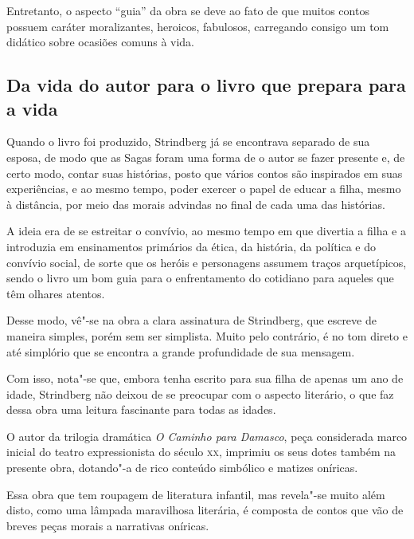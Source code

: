 \documentclass[12pt]{extarticle}
\begin{document}
Entretanto, o aspecto ``guia'' da obra se deve ao fato de que muitos
contos possuem caráter moralizantes, heroicos, fabulosos, carregando
consigo um tom didático sobre ocasiões comuns à vida.

\subsection{Da vida do autor para o livro que prepara para a vida}

Quando o livro foi produzido, Strindberg já se encontrava separado de
sua esposa, de modo que as Sagas foram uma forma de o autor se fazer
presente e, de certo modo, contar suas histórias, posto que vários
contos são inspirados em suas experiências, e ao mesmo tempo, poder
exercer o papel de educar a filha, mesmo à distância, por meio das
morais advindas no final de cada uma das histórias.




A ideia era de se estreitar o convívio, ao mesmo tempo em que divertia a
filha e a introduzia em ensinamentos primários da ética, da história, da
política e do convívio social, de sorte que os heróis e personagens
assumem traços arquetípicos, sendo o livro um bom guia para o
enfrentamento do cotidiano para aqueles que têm olhares atentos.

Desse modo, vê"-se na obra a clara assinatura de Strindberg, que escreve
de maneira simples, porém sem ser simplista. Muito pelo contrário, é no
tom direto e até simplório que se encontra a grande profundidade de sua
mensagem.

Com isso, nota"-se que, embora tenha escrito para sua filha de apenas um
ano de idade, Strindberg não deixou de se preocupar com o aspecto
literário, o que faz dessa obra uma leitura fascinante para todas as
idades.




O autor da trilogia dramática \emph{O Caminho para Damasco}, peça
considerada marco inicial do teatro expressionista do século \textsc{xx},
imprimiu os seus dotes também na presente obra, dotando"-a de rico
conteúdo simbólico e matizes oníricas.

Essa obra que tem roupagem de literatura infantil, mas revela"-se muito
além disto, como uma lâmpada maravilhosa literária, é composta de contos
que vão de breves peças morais a narrativas oníricas.
\end{document}
